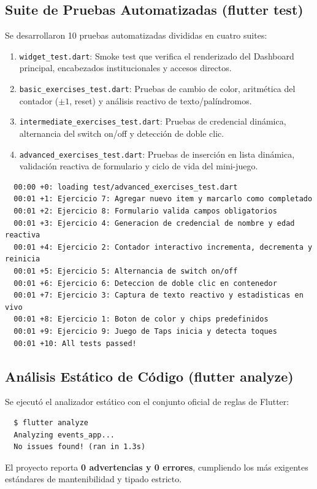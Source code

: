\documentclass[12pt,a4paper]{article}
\begin{document}
  \subsection{Suite de Pruebas Automatizadas (flutter test)}
  Se desarrollaron 10 pruebas automatizadas divididas en cuatro suites:
  \begin{enumerate}[leftmargin=*]
      \item \texttt{widget\_test.dart}: Smoke test que verifica el renderizado del Dashboard principal, encabezados institucionales y accesos directos.
      \item \texttt{basic\_exercises\_test.dart}: Pruebas de cambio de color, aritmética del contador ($\pm 1$, reset) y análisis reactivo de texto/palíndromos.
      \item \texttt{intermediate\_exercises\_test.dart}: Pruebas de credencial dinámica, alternancia del switch on/off y detección de doble clic.
      \item \texttt{advanced\_exercises\_test.dart}: Pruebas de inserción en lista dinámica, validación reactiva de formulario y ciclo de vida del mini-juego.
  \end{enumerate}

  \begin{tcolorbox}[colback=calloutbg,colframe=calloutborder,title=\textbf{Resultado de Ejecución de Pruebas Automatizadas}]
  \begin{verbatim}
  00:00 +0: loading test/advanced_exercises_test.dart
  00:01 +1: Ejercicio 7: Agregar nuevo item y marcarlo como completado
  00:01 +2: Ejercicio 8: Formulario valida campos obligatorios
  00:01 +3: Ejercicio 4: Generacion de credencial de nombre y edad reactiva
  00:01 +4: Ejercicio 2: Contador interactivo incrementa, decrementa y reinicia
  00:01 +5: Ejercicio 5: Alternancia de switch on/off
  00:01 +6: Ejercicio 6: Deteccion de doble clic en contenedor
  00:01 +7: Ejercicio 3: Captura de texto reactivo y estadisticas en vivo
  00:01 +8: Ejercicio 1: Boton de color y chips predefinidos
  00:01 +9: Ejercicio 9: Juego de Taps inicia y detecta toques
  00:01 +10: All tests passed!
  \end{verbatim}
  \end{tcolorbox}

  \subsection{Análisis Estático de Código (flutter analyze)}
  Se ejecutó el analizador estático con el conjunto oficial de reglas de Flutter:
  \begin{tcolorbox}[colback=calloutbg,colframe=calloutborder,title=\textbf{Resultado del Análisis Estático de Código}]
  \begin{verbatim}
  $ flutter analyze
  Analyzing events_app...
  No issues found! (ran in 1.3s)
  \end{verbatim}
  \end{tcolorbox}
  El proyecto reporta \textbf{0 advertencias y 0 errores}, cumpliendo los más exigentes estándares de mantenibilidad y tipado estricto.
\end{document}
